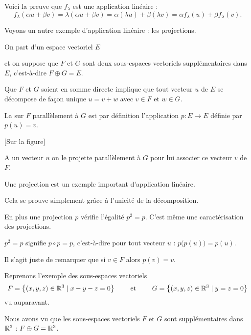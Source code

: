 Voici la preuve que $f_{\lambda}$ est une application linéaire :
$$
f_{\lambda}(\alpha u + \beta v) 
= \lambda (\alpha u + \beta v) 
= \alpha (\lambda u)+ \beta (\lambda v) 
= \alpha f_{\lambda}(u) +\beta f_{\lambda}(v).
$$


\diapo

Voyons un autre exemple d'application linéaire : les projections.

\change


On part d'un  espace vectoriel $E$

et on suppose que $F$ et $G$ sont deux sous-espaces
vectoriels supplémentaires dans $E$, c'est-à-dire 
$F \oplus G = E$.

\change

Que $F$ et $G$ soient en somme directe implique que tout vecteur $u$ de $E$ 
se décompose de façon unique  $u=v+w$ avec $v \in F$ et $w \in G$. 

\change

La  sur $F$ parallèlement à $G$ est par définition l'application $p : E \to E$
définie par $p(u)=v$.  

[Sur la figure]

A un vecteur $u$ on le projette parallèlement à $G$ pour lui associer
ce vecteur $v$ de $F$.



\change

Une projection est un exemple important d'application linéaire. 

Cela se prouve simplement grâce à l'unicité de la décomposition.

\change

En plus une projection $p$ vérifie l'égalité $p^2=p$. 
C'est même une caractérisation des projections.

$p^2=p$ signifie $p\circ p = p$, c'est-à-dire pour tout vecteur $u$ :
$p\big(p(u)\big) = p(u)$.

Il s'agit juste de remarquer que si $v \in F$ alors $p(v) = v$.


\diapo

Reprenons l'exemple des sous-espaces vectoriels 
$$F=\big\{ (x,y,z) \in \mathbb{R}^3\mid x-y-z=0\big\} \qquad  \text{ et } \qquad 
G=\big\{(x,y,z) \in \mathbb{R}^3 \mid y=z=0 \big\}$$
vu auparavant.


\change

Nous avons vu que les sous-espaces vectoriels $F$ et $G$ 
sont supplémentaires dans $\mathbb{R}^3$ : $ F \oplus G = \mathbb{R}^3$.

